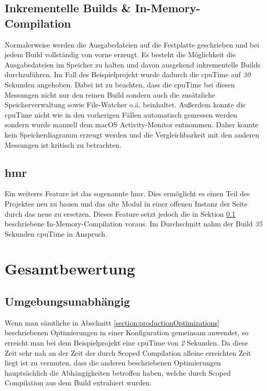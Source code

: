 \documentclass[11pt]{report}
\begin{document}

    		\subsection{Inkrementelle Builds \& In-Memory-Compilation}
    			\label{section:incrementalBuilds}
    			Normalerweise werden die Ausgabedateien auf die Festplatte geschrieben und bei jedem Build vollständig von vorne erzeugt. Es besteht die Möglichkeit die Ausgabedateien im Speicher zu halten und davon ausgehend inkrementelle Builds durchzuführen. Im Fall des Beispielprojekt wurde dadurch die \Gls{cpuTime} auf \emph{30} Sekunden angehoben. Dabei ist zu beachten, dass die \Gls{cpuTime} bei diesen Messungen nicht nur den reinen Build sondern auch die zusätzliche Speicherverwaltung sowie File-Watcher o.ä. beinhaltet. Außerdem konnte die \Gls{cpuTime} nicht wie in den vorherigen Fällen automatisch gemessen werden sondern wurde manuell dem macOS Activity-Monitor entnommen. Daher konnte kein Speicherdiagramm erzeugt werden und die Vergleichbarkeit mit den anderen Messungen ist kritisch zu betrachten.

    		\subsection{\Gls{hmr}}
    			Ein weiteres Feature ist das sogenannte \Gls{hmr}. Dies ermöglicht es einen Teil des Projektes neu zu bauen und das alte Modul in einer offenen Instanz der Seite durch das neue zu ersetzen. Dieses Feature setzt jedoch die in Sektion \ref{section:incrementalBuilds} beschriebene In-Memory-Compilation voraus. Im Durchschnitt nahm der Build \emph{35} Sekunden \Gls{cpuTime} in Anspruch.

		\section{Gesamtbewertung}
			\subsection{Umgebungsunabhängig}
				Wenn man sämtliche in Abschnitt \ref{section:productionOptimizations} beschriebenen Optimierungen in einer Konfiguration gemeinsam anwendet, so erreicht man bei dem Beispielprojekt eine \Gls{cpuTime} von \emph{2} Sekunden. Da diese Zeit sehr nah an der Zeit der durch Scoped Compilation alleine erreichten Zeit liegt ist zu vermuten, dass die anderen beschriebenen Optimierungen hauptsächlich die Abhängigkeiten betroffen haben, welche durch Scoped Compilation aus dem Build extrahiert wurden.
\end{document}
